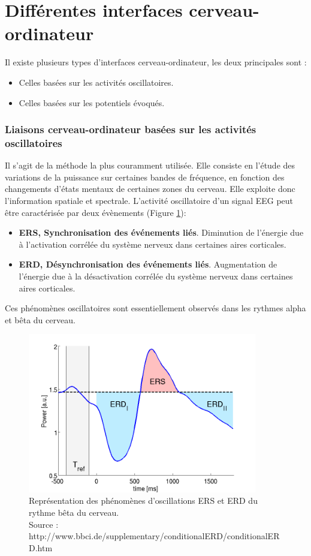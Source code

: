 \section{Différentes interfaces cerveau-ordinateur}
\label{Section : 4.Différents types d'interfaces cerveau-ordinateur}

Il existe plusieurs types d'interfaces cerveau-ordinateur, les deux principales sont :
\smallbreak
\begin{itemize}
	\item Celles basées sur les activités oscillatoires. 
	\smallbreak
	\item Celles basées sur les potentiels évoqués. 
\end{itemize} 
\smallbreak
\subsubsection{Liaisons cerveau-ordinateur basées sur les activités oscillatoires}
\label{Subsection : 4.Liaisons cerveau-ordinateur basées sur les activités oscillatoires}

Il s'agit de la méthode la plus couramment utilisée. Elle consiste en l'étude des variations de la puissance sur certaines bandes de fréquence, en fonction des changements d'états mentaux de certaines zones du cerveau. Elle exploite donc l'information spatiale et spectrale. L'activité oscillatoire d'un signal EEG peut être caractérisée par deux évènements (Figure \ref{ers}):
\smallbreak 
\begin{itemize}
	\item \textbf{ERS, Synchronisation des événements liés}. Diminution de l'énergie due à l'activation corrélée du système nerveux dans certaines aires corticales.
	\smallbreak
	\item \textbf{ERD, Désynchronisation des événements liés}. Augmentation de l'énergie due à la désactivation corrélée du système nerveux dans certaines aires corticales.
\end{itemize} 
\smallbreak
Ces phénomènes oscillatoires sont essentiellement observés dans les rythmes alpha et bêta du cerveau.

\begin{figure}[h]
	\centering\includegraphics[width=10cm]{images/ERS_ERD.png}
	\caption[Représentation des phénomènes d'oscillations ERS et ERD du rythme bêta du cerveau]{Représentation des phénomènes d'oscillations ERS et ERD du rythme bêta du cerveau.\\Source : http://www.bbci.de/supplementary/conditionalERD/conditionalERD.htm}
	\label{ers}
\end{figure}

